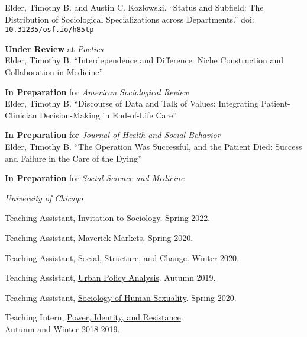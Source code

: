 \documentclass[11pt,article,oneside]{memoir}
\begin{document}
\ind Elder, Timothy B. and Austin C. Kozlowski. ``Status and Subfield: The Distribution of Sociological Specializations across Departments.'' doi: \texttt{\href{https://osf.io/preprints/socarxiv/h85tp/}{10.31235/osf.io/h85tp}} \\
	\strut\hspace{0.4in} \footnotesize \textbf{Under Review} at \textit{Poetics} \normalsize \\

\ind Elder, Timothy B. ``Interdependence and Difference: Niche Construction and Collaboration in Medicine'' \\
	\strut\hspace{0.4in} \footnotesize \textbf{In Preparation} for \textit{American Sociological Review} \normalsize\\

\ind Elder, Timothy B. ``Discourse of Data and Talk of Values: Integrating Patient-Clinician Decision-Making in End-of-Life Care'' \\
	\strut\hspace{0.4in} \footnotesize \textbf{In Preparation} for \textit{Journal of Health and Social Behavior} \normalsize \\

\ind Elder, Timothy B. ``The Operation Was Successful, and the Patient Died: Success and Failure in the Care of the Dying'' \\
	\strut\hspace{0.4in} \footnotesize \textbf{In Preparation} for \textit{Social Science and Medicine} \normalsize \\

\bigskip

\medskip
\noindent\emph{University of Chicago \vspace{0.01in}}

\ind Teaching Assistant, \underline{Invitation to Sociology}. Spring 2022.

\ind Teaching Assistant, \underline{Maverick Markets}. Spring 2020.

\ind Teaching Assistant, \underline{Social, Structure, and Change}. Winter 2020.

\ind Teaching Assistant, \underline{Urban Policy Analysis}. Autumn 2019.

\ind Teaching Assistant, \underline{Sociology of Human Sexuality}. Spring 2020.

\ind Teaching Intern, \underline{Power, Identity, and Resistance}. \\ Autumn and Winter 2018-2019.
\end{document}
